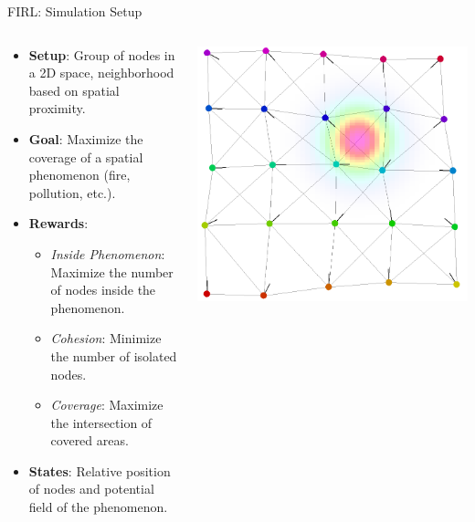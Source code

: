 \documentclass[presentation, 9pt,169]{beamer}\mode<presentation>{\usetheme{AMSBolognaFC}}
\begin{document}
\begin{frame}{FIRL: Simulation Setup}

  \begin{columns}
    \begin{column}{0.5\textwidth}  %
        \begin{itemize}
          \item \textbf{Setup}: Group of nodes in a 2D space, neighborhood based on spatial proximity.
          \item \textbf{Goal}: Maximize the coverage of a spatial phenomenon (fire, pollution, etc.).
          \item \textbf{Rewards}: 
            \begin{itemize}
              \item \emph{Inside Phenomenon}: Maximize the number of nodes inside the phenomenon.
              \item \emph{Cohesion}: Minimize the number of isolated nodes.
              \item \emph{Coverage}: Maximize the intersection of covered areas.
            \end{itemize}
          \item \textbf{States}: Relative position of nodes and potential field of the phenomenon.
        \end{itemize}
    \end{column}
    \begin{column}{0.5\textwidth}  %
      \centering
      \includegraphics[width=\textwidth]{img/coverage-setup.png}
    \end{column}
  \end{columns}
\end{frame}
\end{document}

